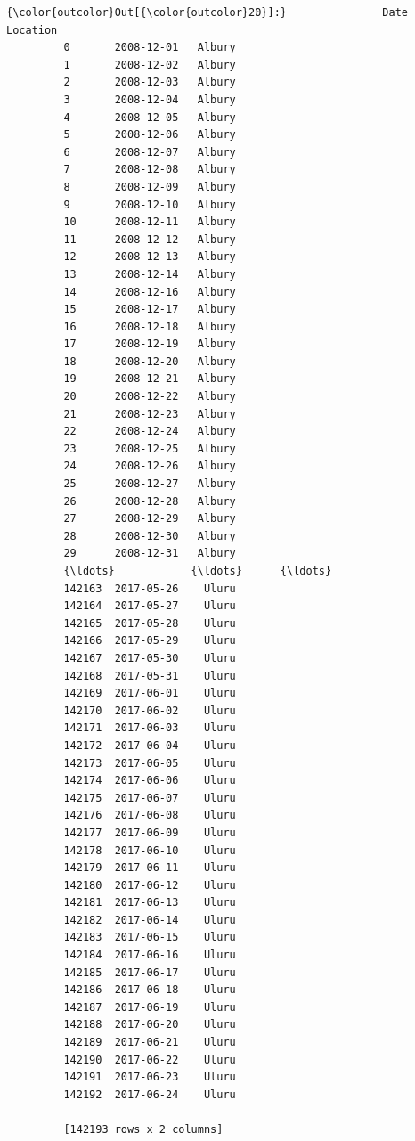 \documentclass[11pt]{article}
\begin{document}
\begin{Verbatim}[commandchars=\\\{\}]
{\color{outcolor}Out[{\color{outcolor}20}]:}               Date Location
         0       2008-12-01   Albury
         1       2008-12-02   Albury
         2       2008-12-03   Albury
         3       2008-12-04   Albury
         4       2008-12-05   Albury
         5       2008-12-06   Albury
         6       2008-12-07   Albury
         7       2008-12-08   Albury
         8       2008-12-09   Albury
         9       2008-12-10   Albury
         10      2008-12-11   Albury
         11      2008-12-12   Albury
         12      2008-12-13   Albury
         13      2008-12-14   Albury
         14      2008-12-16   Albury
         15      2008-12-17   Albury
         16      2008-12-18   Albury
         17      2008-12-19   Albury
         18      2008-12-20   Albury
         19      2008-12-21   Albury
         20      2008-12-22   Albury
         21      2008-12-23   Albury
         22      2008-12-24   Albury
         23      2008-12-25   Albury
         24      2008-12-26   Albury
         25      2008-12-27   Albury
         26      2008-12-28   Albury
         27      2008-12-29   Albury
         28      2008-12-30   Albury
         29      2008-12-31   Albury
         {\ldots}            {\ldots}      {\ldots}
         142163  2017-05-26    Uluru
         142164  2017-05-27    Uluru
         142165  2017-05-28    Uluru
         142166  2017-05-29    Uluru
         142167  2017-05-30    Uluru
         142168  2017-05-31    Uluru
         142169  2017-06-01    Uluru
         142170  2017-06-02    Uluru
         142171  2017-06-03    Uluru
         142172  2017-06-04    Uluru
         142173  2017-06-05    Uluru
         142174  2017-06-06    Uluru
         142175  2017-06-07    Uluru
         142176  2017-06-08    Uluru
         142177  2017-06-09    Uluru
         142178  2017-06-10    Uluru
         142179  2017-06-11    Uluru
         142180  2017-06-12    Uluru
         142181  2017-06-13    Uluru
         142182  2017-06-14    Uluru
         142183  2017-06-15    Uluru
         142184  2017-06-16    Uluru
         142185  2017-06-17    Uluru
         142186  2017-06-18    Uluru
         142187  2017-06-19    Uluru
         142188  2017-06-20    Uluru
         142189  2017-06-21    Uluru
         142190  2017-06-22    Uluru
         142191  2017-06-23    Uluru
         142192  2017-06-24    Uluru
         
         [142193 rows x 2 columns]
\end{Verbatim}
            
\end{document}
